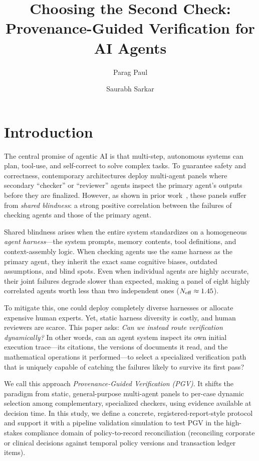 \documentclass[manuscript,screen,nonacm]{acmart}
\title{Choosing the Second Check: Provenance-Guided Verification for AI Agents}
\author{Parag Paul}
\affiliation{%
  \institution{RigAi / Agentic Memory Foundation}
  \city{Seattle}
  \country{USA}
}
\author{Saurabh Sarkar}
\affiliation{%
  \institution{Chicory AI / Agentic Memory Foundation}
  \city{Seattle}
  \country{USA}
}
\newcommand{\Neff}{N_{\mathrm{eff}}}
\begin{document}
\maketitle

\section{Introduction}
\label{sec:intro}

The central promise of agentic AI is that multi-step, autonomous systems can plan, tool-use, and self-correct to solve complex tasks. To guarantee safety and correctness, contemporary architectures deploy multi-agent panels where secondary ``checker'' or ``reviewer'' agents inspect the primary agent's outputs before they are finalized. However, as shown in prior work~\cite{paul2026shared}, these panels suffer from \emph{shared blindness}: a strong positive correlation between the failures of checking agents and those of the primary agent. 

Shared blindness arises when the entire system standardizes on a homogeneous \emph{agent harness}—the system prompts, memory contents, tool definitions, and context-assembly logic. When checking agents use the same harness as the primary agent, they inherit the exact same cognitive biases, outdated assumptions, and blind spots. Even when individual agents are highly accurate, their joint failures degrade slower than expected, making a panel of eight highly correlated agents worth less than two independent ones ($\Neff \approx \MixNeffKOne$).

To mitigate this, one could deploy completely diverse harnesses or allocate expensive human experts. Yet, static harness diversity is costly, and human reviewers are scarce. This paper asks: \emph{Can we instead route verification dynamically?} In other words, can an agent system inspect its own initial execution trace—its citations, the versions of documents it read, and the mathematical operations it performed—to select a specialized verification path that is uniquely capable of catching the failures likely to survive its first pass?

We call this approach \emph{Provenance-Guided Verification (PGV)}. It shifts the paradigm from static, general-purpose multi-agent panels to per-case dynamic selection among complementary, specialized checkers, using evidence available at decision time. In this study, we define a concrete, registered-report-style protocol and support it with a pipeline validation simulation to test PGV in the high-stakes compliance domain of policy-to-record reconciliation (reconciling corporate or clinical decisions against temporal policy versions and transaction ledger items).
\end{document}
